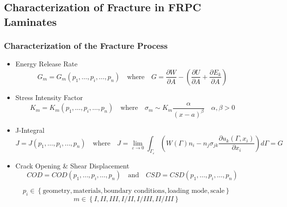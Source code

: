 \documentclass[first,firstsupp,lastsupp,last,hyperref,table]{ETHclass}
\begin{document}
\subsection[Characterization of Fracture in FRPC]{Characterization of Fracture in FRPC Laminates}

\begin{frame}
\frametitle{\small Characterization of the Fracture Process}
\vspace{-0.25cm}
\centering
\scriptsize
\begin{itemize}[label=]
\item Energy Release Rate
\begin{equation*}
G_{m}=G_{m}\left(p_{1},\dots,p_{i},\dots,p_{n}\right)\quad\text{where}\quad G=\frac{\partial W}{\partial A} - \left(\frac{\partial U}{\partial A}+\frac{\partial E_{k}}{\partial A}\right)
\end{equation*}
\item Stress Intensity Factor
\begin{equation*}
K_{m}=K_{m}\left(p_{1},\dots,p_{i},\dots,p_{n}\right)\quad\text{where}\quad \sigma_{m}\sim K_{m}\frac{\alpha}{\left(x-a\right)^{\beta}}\quad\alpha,\beta>0
\end{equation*}
\item J-Integral
\begin{equation*}
J=J\left(p_{1},\dots,p_{i},\dots,p_{n}\right)\quad\text{where}\quad J=\lim_{\varepsilon\to 0}\int_{\Gamma_{\varepsilon}}\left(W\left(\Gamma\right)n_{i}-n_{j}\sigma_{jk}\frac{\partial u_{k}\left(\Gamma,x_{i}\right)}{\partial x_{i}}\right)d\Gamma = G
\end{equation*}
\item Crack Opening \& Shear Displacement
\begin{equation*}
COD=COD\left(p_{1},\dots,p_{i},\dots,p_{n}\right)\quad\text{and}\quad CSD=CSD\left(p_{1},\dots,p_{i},\dots,p_{n}\right)
\end{equation*}
\end{itemize}
\vspace{5pt}
\begin{equation*}
p_{i}\in\left\{\text{geometry},\text{materials},\text{boundary conditions},\text{loading mode},\text{scale}\right\}
\end{equation*}
\begin{equation*}
m\in\left\{I,II,III,I/II,I/III,II/III\right\}
\end{equation*}
\end{frame}
\end{document}

